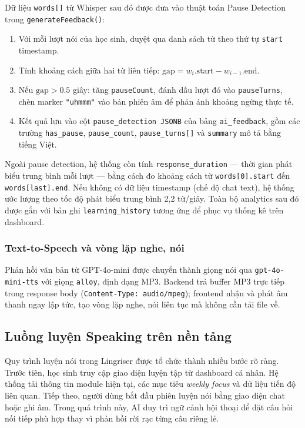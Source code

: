 Dữ liệu \texttt{words[]} từ Whisper sau đó được đưa vào thuật toán Pause Detection trong \texttt{generateFeedback()}:

\begin{enumerate}
    \item Với mỗi lượt nói của học sinh, duyệt qua danh sách từ theo thứ tự \texttt{start} timestamp.
    \item Tính khoảng cách giữa hai từ liên tiếp: $\text{gap} = w_i.\text{start} - w_{i-1}.\text{end}$.
    \item Nếu $\text{gap} > 0.5$ giây: tăng \texttt{pauseCount}, đánh dấu lượt đó vào \texttt{pauseTurns}, chèn marker \texttt{"uhmmm"} vào bản phiên âm để phản ánh khoảng ngừng thực tế.
    \item Kết quả lưu vào cột \texttt{pause\_detection JSONB} của bảng \texttt{ai\_feedback}, gồm các trường \texttt{has\_pause}, \texttt{pause\_count}, \texttt{pause\_turns[]} và \texttt{summary} mô tả bằng tiếng Việt.
\end{enumerate}

Ngoài pause detection, hệ thống còn tính \texttt{response\_duration} — thời gian phát biểu trung bình mỗi lượt — bằng cách đo khoảng cách từ \texttt{words[0].start} đến \texttt{words[last].end}. Nếu không có dữ liệu timestamp (chế độ chat text), hệ thống ước lượng theo tốc độ phát biểu trung bình 2,2 từ/giây. Toàn bộ analytics sau đó được gắn với bản ghi \texttt{learning\_history} tương ứng để phục vụ thống kê trên dashboard.

\subsubsection{Text-to-Speech và vòng lặp nghe, nói}

Phản hồi văn bản từ GPT-4o-mini được chuyển thành giọng nói qua \texttt{gpt-4o-mini-tts} với giọng \texttt{alloy}, định dạng MP3. Backend trả buffer MP3 trực tiếp trong response body (\texttt{Content-Type: audio/mpeg}); frontend nhận và phát âm thanh ngay lập tức, tạo vòng lặp nghe, nói liên tục mà không cần tải file về.

\subsection{Luồng luyện Speaking trên nền tảng}
Quy trình luyện nói trong Lingriser được tổ chức thành nhiều bước rõ ràng. Trước tiên, học sinh truy cập giao diện luyện tập từ dashboard cá nhân. Hệ thống tải thông tin module hiện tại, các mục tiêu \textit{weekly focus} và dữ liệu tiến độ liên quan. Tiếp theo, người dùng bắt đầu phiên luyện nói bằng giao diện chat hoặc ghi âm. Trong quá trình này, AI duy trì ngữ cảnh hội thoại để đặt câu hỏi nối tiếp phù hợp thay vì phản hồi rời rạc từng câu riêng lẻ.


